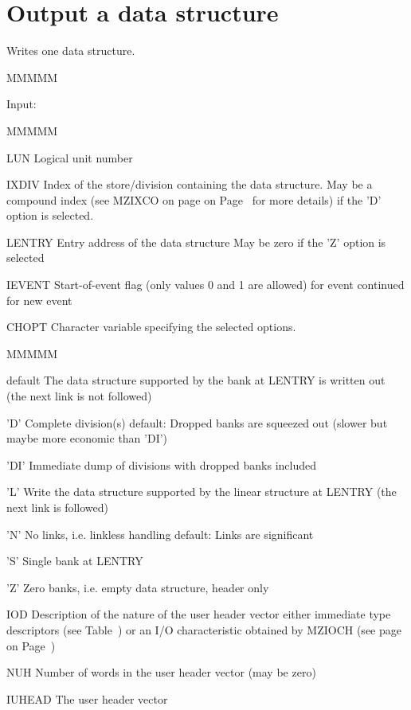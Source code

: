 \section{Output a data structure}
\par Writes one data structure.
\begin{DL}{MMMMM}
\item[Input:
]
\begin{DL}{MMMMM}
\item[LUN
]Logical unit number
\item[IXDIV
]Index of the store/division containing the data structure.
\newline May be a compound index (see MZIXCO
on page on Page~\pageref{MZIXCO FORM=PAGEONLY}
for more details) if the 'D' option is selected.
\item[LENTRY
]Entry address of the data structure
\newline May be zero if the 'Z' option is selected
\item[IEVENT
]Start-of-event flag (only values 0 and 1 are allowed)
  for event continued
  for new event
\item[CHOPT
]Character variable specifying the selected options.
\begin{DL}{MMMMM}
\item[default
]The data structure supported by the bank at LENTRY is written out
\newline (the next link is not followed)
\item['D'
]Complete division(s)
\newline default: Dropped banks are squeezed out
\newline              (slower but maybe more economic than 'DI')
\item['DI'
]Immediate dump of divisions with dropped banks included
\item['L'
]Write the data structure supported by the linear structure at LENTRY
\newline (the next link is followed)
\item['N'
]No links, i.e. linkless handling
\newline default: Links are significant
\item['S'
]Single bank at LENTRY
\item['Z'
]Zero banks, i.e. empty data structure, header only
\end{DL}
\item[IOD
]Description of the nature of the user header vector
\newline either immediate type descriptors (see Table~\pageref{MZFORMS})
or an I/O characteristic obtained by MZIOCH
(see page on Page~\pageref{MZIOCH FORM=PAGEONLY})
\item[NUH
]Number of words in the user header vector (may be zero)
\item[IUHEAD
]The user header vector
\end{DL}
\end{DL}
